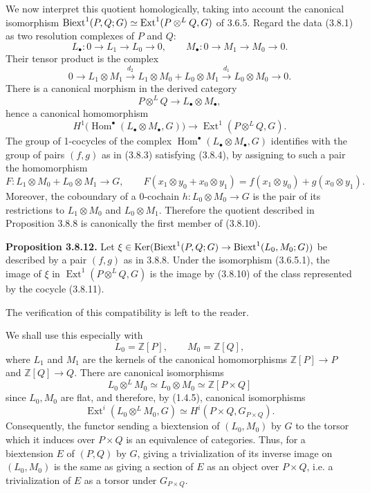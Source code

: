 \documentclass[11pt]{article}
\providecommand{\Ker}{\operatorname{Ker}}
\providecommand{\Z}{\mathbb Z}
\providecommand{\Hom}{\operatorname{Hom}}
\providecommand{\Ext}{\operatorname{Ext}}
\begin{document}
We now interpret this quotient homologically, taking into account the canonical isomorphism
\(\Biext^1(P,Q;G)\simeq\Ext^1(P\otimes^L Q,G)\) of 3.6.5.  Regard the data (3.8.1) as two resolution complexes of \(P\) and \(Q\):
\begin{equation}\tag{3.8.9}
        L_\bullet:0\longrightarrow L_1\longrightarrow L_0\longrightarrow 0,
        \qquad
        M_\bullet:0\longrightarrow M_1\longrightarrow M_0\longrightarrow 0.
\end{equation}
Their tensor product is the complex
\[
        0\longrightarrow L_1\otimes M_1
        \xrightarrow{d_2}L_1\otimes M_0+L_0\otimes M_1
        \xrightarrow{d_1}L_0\otimes M_0
        \longrightarrow0.
\]
There is a canonical morphism in the derived category
\[
        P\otimes^L Q\longrightarrow L_\bullet\otimes M_\bullet,
\]
hence a canonical homomorphism
\begin{equation}\tag{3.8.10}
        H^1\bigl(\Hom^\bullet(L_\bullet\otimes M_\bullet,G)\bigr)
        \longrightarrow \Ext^1(P\otimes^L Q,G).
\end{equation}
The group of 1-cocycles of the complex \(\Hom^\bullet(L_\bullet\otimes M_\bullet,G)\) identifies with the group of pairs \((f,g)\) as in (3.8.3) satisfying (3.8.4), by assigning to such a pair the homomorphism
\begin{equation}\tag{3.8.11}
        F:L_1\otimes M_0+L_0\otimes M_1\longrightarrow G,
        \qquad
        F(x_1\otimes y_0+x_0\otimes y_1)=f(x_1\otimes y_0)+g(x_0\otimes y_1).
\end{equation}
Moreover, the coboundary of a 0-cochain \(h:L_0\otimes M_0\to G\) is the pair of its restrictions to \(L_1\otimes M_0\) and \(L_0\otimes M_1\).  Therefore the quotient described in Proposition 3.8.8 is canonically the first member of (3.8.10).

\textbf{Proposition 3.8.12.}  Let \(\xi\in\Ker(\Biext^1(P,Q;G)\to\Biext^1(L_0,M_0;G))\) be described by a pair \((f,g)\) as in 3.8.8.  Under the isomorphism (3.6.5.1), the image of \(\xi\) in \(\Ext^1(P\otimes^L Q,G)\) is the image by (3.8.10) of the class represented by the cocycle (3.8.11).

The verification of this compatibility is left to the reader.

We shall use this especially with
\[
        L_0=\Z[P],\qquad M_0=\Z[Q],
\]
where \(L_1\) and \(M_1\) are the kernels of the canonical homomorphisms \(\Z[P]\to P\) and \(\Z[Q]\to Q\).  There are canonical isomorphisms
\[
        L_0\otimes^L M_0\simeq L_0\otimes M_0\simeq \Z[P\times Q]
\]
since \(L_0,M_0\) are flat, and therefore, by (1.4.5), canonical isomorphisms
\[
        \Ext^i(L_0\otimes^L M_0,G)
        \simeq H^i(P\times Q,G_{P\times Q}).
\]
Consequently, the functor sending a biextension of \((L_0,M_0)\) by \(G\) to the torsor which it induces over \(P\times Q\) is an equivalence of categories.  Thus, for a biextension \(E\) of \((P,Q)\) by \(G\), giving a trivialization of its inverse image on \((L_0,M_0)\) is the same as giving a section of \(E\) as an object over \(P\times Q\), i.e. a trivialization of \(E\) as a torsor under \(G_{P\times Q}\).
\end{document}
